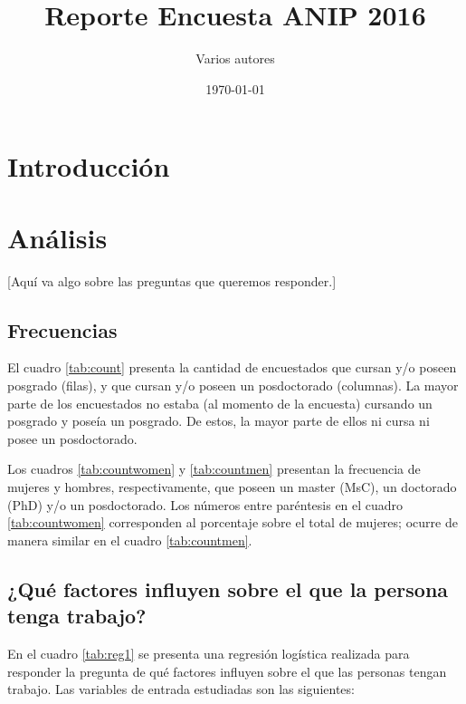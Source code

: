 \documentclass{article}
\title{Reporte Encuesta ANIP 2016}
\author{Varios autores}
\date{\today}
\begin{document}
\maketitle

\section{Introducción}

\section{Análisis}

[Aquí va algo sobre las preguntas que queremos responder.]

\subsection{Frecuencias}

El cuadro \ref{tab:count} presenta la cantidad de encuestados que cursan y/o poseen posgrado (filas), y que cursan y/o poseen un posdoctorado (columnas). La mayor parte de los encuestados no estaba (al momento de la encuesta) cursando un posgrado y poseía un posgrado. De estos, la mayor parte de ellos ni cursa ni posee un posdoctorado.

Los cuadros \ref{tab:countwomen} y \ref{tab:countmen} presentan la frecuencia de mujeres y hombres, respectivamente, que poseen un master (MsC), un doctorado (PhD) y/o un posdoctorado. Los números entre paréntesis en el cuadro \ref{tab:countwomen} corresponden al porcentaje sobre el total de mujeres; ocurre de manera similar en el cuadro \ref{tab:countmen}.





\subsection{¿Qué factores influyen sobre el que la persona tenga trabajo?}


En el cuadro \ref{tab:reg1} se presenta una regresión logística realizada para responder la pregunta de qué factores influyen sobre el que las personas tengan trabajo. Las variables de entrada estudiadas son las siguientes:
\end{document}
